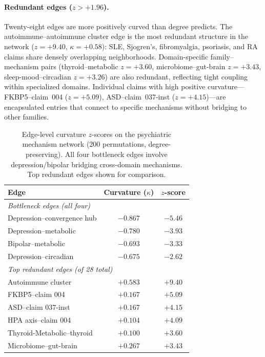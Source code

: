 \documentclass[11pt]{article}
\begin{document}
\paragraph{Redundant edges ($z > +1.96$).} Twenty-eight edges are more positively curved than degree predicts. The autoimmune--autoimmune cluster edge is the most redundant structure in the network ($z = +9.40$, $\kappa = +0.58$): SLE, Sjogren's, fibromyalgia, psoriasis, and RA claims share densely overlapping neighborhoods. Domain-specific family--mechanism pairs (thyroid--metabolic $z = +3.60$, microbiome--gut-brain $z = +3.43$, sleep-mood--circadian $z = +3.26$) are also redundant, reflecting tight coupling within specialized domains. Individual claims with high positive curvature---FKBP5--claim~004 ($z = +5.09$), ASD--claim~037-inst ($z = +4.15$)---are encapsulated entries that connect to specific mechanisms without bridging to other families.

\begin{table}[t]
\centering
\caption{Edge-level curvature $z$-scores on the psychiatric mechanism network (200 permutations, degree-preserving). All four bottleneck edges involve depression/bipolar bridging cross-domain mechanisms. Top redundant edges shown for comparison.}
\label{tab:edge_null}
\begin{tabular}{lcc}
\toprule
Edge & Curvature ($\kappa$) & $z$-score \\
\midrule
\multicolumn{3}{l}{\emph{Bottleneck edges (all four)}} \\
Depression--convergence hub & $-0.867$ & $\mathbf{-5.46}$ \\
Depression--metabolic & $-0.780$ & $\mathbf{-3.93}$ \\
Bipolar--metabolic & $-0.693$ & $\mathbf{-3.33}$ \\
Depression--circadian & $-0.675$ & $-2.62$ \\
\midrule
\multicolumn{3}{l}{\emph{Top redundant edges (of 28 total)}} \\
Autoimmune cluster & $+0.583$ & $\mathbf{+9.40}$ \\
FKBP5--claim 004 & $+0.167$ & $\mathbf{+5.09}$ \\
ASD--claim 037-inst & $+0.167$ & $+4.15$ \\
HPA axis--claim 004 & $+0.104$ & $+4.09$ \\
Thyroid-Metabolic--thyroid & $+0.100$ & $+3.60$ \\
Microbiome--gut-brain & $+0.267$ & $+3.43$ \\
\bottomrule
\end{tabular}
\end{table}
\end{document}
